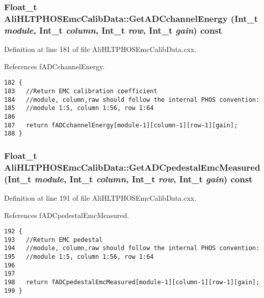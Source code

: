 \subsubsection{\setlength{\rightskip}{0pt plus 5cm}Float\_\-t Ali\-HLTPHOSEmc\-Calib\-Data::Get\-ADCchannel\-Energy (Int\_\-t {\em module}, Int\_\-t {\em column}, Int\_\-t {\em row}, Int\_\-t {\em gain}) const}\label{classAliHLTPHOSEmcCalibData_a7}




Definition at line 181 of file Ali\-HLTPHOSEmc\-Calib\-Data.cxx.

References f\-ADCchannel\-Energy.

\footnotesize\begin{verbatim}182 {
183   //Return EMC calibration coefficient
184   //module, column,raw should follow the internal PHOS convention:
185   //module 1:5, column 1:56, row 1:64
186 
187   return fADCchannelEnergy[module-1][column-1][row-1][gain];
188 }
\end{verbatim}\normalsize 


\subsubsection{\setlength{\rightskip}{0pt plus 5cm}Float\_\-t Ali\-HLTPHOSEmc\-Calib\-Data::Get\-ADCpedestal\-Emc\-Measured (Int\_\-t {\em module}, Int\_\-t {\em column}, Int\_\-t {\em row}, Int\_\-t {\em gain}) const}\label{classAliHLTPHOSEmcCalibData_a8}




Definition at line 191 of file Ali\-HLTPHOSEmc\-Calib\-Data.cxx.

References f\-ADCpedestal\-Emc\-Measured.

\footnotesize\begin{verbatim}192 {
193   //Return EMC pedestal
194   //module, column,raw should follow the internal PHOS convention:
195   //module 1:5, column 1:56, row 1:64
196 
197 
198   return fADCpedestalEmcMeasured[module-1][column-1][row-1][gain];
199 }
\end{verbatim}\normalsize 


